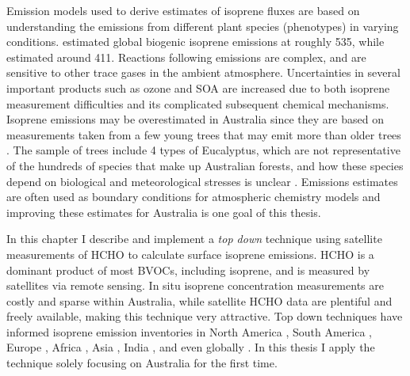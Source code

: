   Emission models used to derive estimates of isoprene fluxes are based on understanding the emissions from different plant species (phenotypes) in varying conditions.
  \textcite{Guenther2012} estimated global biogenic isoprene emissions at roughly 535\tgpyr, while \textcite{Sindelarova2014} estimated around 411\tgpyr.
  Reactions following emissions are complex, and are sensitive to other trace gases in the ambient atmosphere.
  Uncertainties in several important products such as ozone and SOA are increased due to both isoprene measurement difficulties and its complicated subsequent chemical mechanisms.
  Isoprene emissions may be overestimated in Australia since they are based on measurements taken from a few young trees \parencite{Winters2009} that may emit more than older trees \parencite{Emerson2016}.
  The sample of trees include 4 types of Eucalyptus, which are not representative of the hundreds of species that make up Australian forests, and how these species depend on biological and meteorological stresses is unclear \parencite{Winters2009, FortemsCheiney2012}.
  Emissions estimates are often used as boundary conditions for atmospheric chemistry models and improving these estimates for Australia is one goal of this thesis.
  
  
  In this chapter I describe and implement a \textit{top down} technique using satellite measurements of HCHO to calculate surface isoprene emissions.
  HCHO is a dominant product of most BVOCs, including isoprene, and is measured by satellites via remote sensing.
  In situ isoprene concentration measurements are costly and sparse within Australia, while satellite HCHO data are plentiful and freely available, making this technique very attractive.
  Top down techniques have informed isoprene emission inventories in North America \parencite{Abbot2003,Palmer2003,Palmer2006,Millet2006,Millet2008}, South America \parencite{Barkley2013}, Europe \parencite{Dufour2009,Curci2010}, Africa \parencite{Marais2012}, Asia \parencite{Fu2007,Stavrakou2014}, India \parencite{Surl2018}, and even globally \parencite{Shim2005,FortemsCheiney2012,Bauwens2016}.
  In this thesis I apply the technique solely focusing on Australia for the first time.
  
